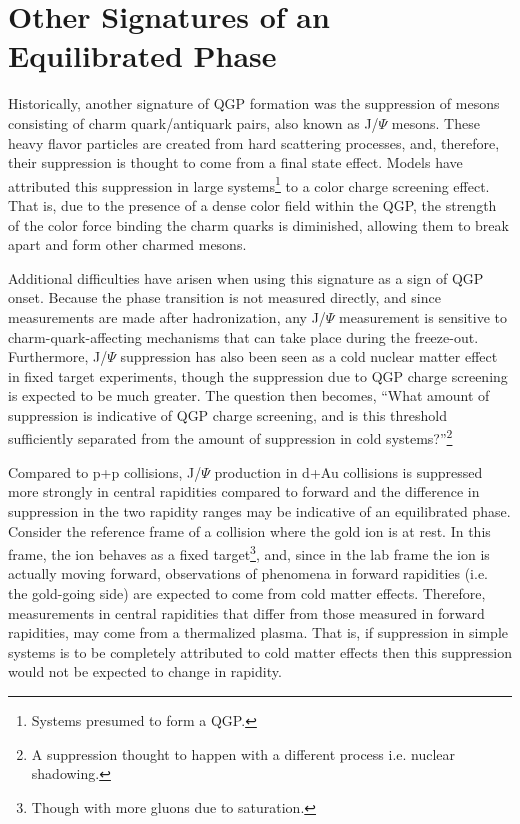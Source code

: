 \section{Other Signatures of an Equilibrated Phase}

Historically, another signature of QGP formation was the suppression of mesons consisting of charm quark/antiquark pairs, also known as J/$\Psi$ mesons. These heavy flavor particles are created from hard scattering processes, and, therefore, their suppression is thought to come from a final state effect. Models have attributed this suppression in large systems\footnote{Systems presumed to form a QGP.} to a color charge screening effect. That is, due to the presence of a dense color field within the QGP, the strength of the color force binding the charm quarks is diminished, allowing them to break apart and form other charmed mesons. 

Additional difficulties have arisen when using this signature as a sign of QGP onset. Because the phase transition is not measured directly, and since measurements are made after hadronization, any J/$\Psi$ measurement is sensitive to charm-quark-affecting mechanisms that can take place during the freeze-out. Furthermore, J/$\Psi$ suppression has also been seen as a cold nuclear matter effect \citep{PhysRevLett.84.3256} in fixed target experiments, though the suppression due to QGP charge screening is expected to be much greater. The question then becomes, ``What amount of suppression is indicative of QGP charge screening, and is this threshold sufficiently separated from the amount of suppression in cold systems?''\footnote{A suppression thought to happen with a different process i.e. nuclear shadowing.} 

Compared to p+p collisions, J/$\Psi$ production in d+Au collisions is suppressed more strongly in central rapidities compared to forward \citep{Adare:2010fn} and the difference in suppression in the two rapidity ranges may be indicative of an equilibrated phase. Consider the reference frame of a collision where the gold ion is at rest. In this frame, the ion behaves as a fixed target\footnote{Though with more gluons due to saturation.}, and, since in the lab frame the ion is actually moving forward, observations of phenomena in forward rapidities (i.e. the gold-going side) are expected to come from cold matter effects. Therefore, measurements in central rapidities that differ from those measured in forward rapidities, may come from a thermalized plasma. That is, if suppression in simple systems is to be completely attributed to cold matter effects then this suppression would not be expected to change in rapidity. 

